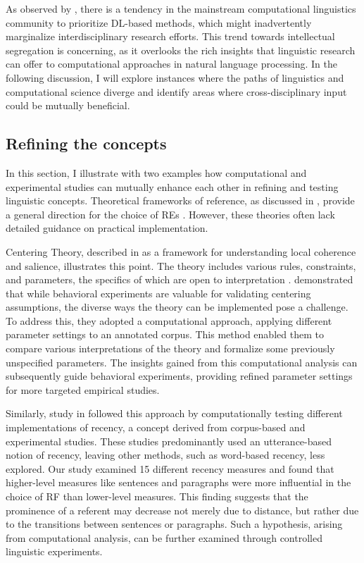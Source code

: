 \begin{sloppypar}
As observed by \citet{rogers-augenstein-2020-improve}, there is a tendency in the mainstream computational linguistics community to prioritize DL-based methods, which might inadvertently marginalize interdisciplinary research efforts. This trend towards intellectual segregation is concerning, as it overlooks the rich insights that linguistic research can offer to computational approaches in natural language processing. In the following discussion, I will explore instances where the paths of linguistics and computational science diverge and identify areas where cross-disciplinary input could be mutually beneficial. 
\end{sloppypar}

\subsection{Refining the concepts} 
In this section, I illustrate with two examples how computational and experimental studies can mutually enhance each other in refining and testing linguistic concepts. Theoretical frameworks of reference, as discussed in , provide a general direction for the choice of REs \citep{gundel1993cognitive, ariel2001accessibility, grosz1995centering}. However, these theories often lack detailed guidance on practical implementation.

Centering Theory, described in  as a framework for understanding local coherence and salience, illustrates this point. The theory includes various rules, constraints, and parameters, the specifics of which are open to interpretation \citep{poesio2004centering}. \citeauthor{poesio2004centering} demonstrated that while behavioral experiments are valuable for validating centering assumptions, the diverse ways the theory can be implemented pose a challenge. To address this, they adopted a computational approach, applying different parameter settings to an annotated corpus. This method enabled them to compare various interpretations of the theory and formalize some previously unspecified parameters. The insights gained from this computational analysis can subsequently guide behavioral experiments, providing refined parameter settings for more targeted empirical studies.

Similarly, study \studC in  followed this approach by computationally testing different implementations of recency, a concept derived from corpus-based \citep{Givon1983, ariel1990accessing} and experimental \citep{Arnold2010} studies. These studies predominantly used an utterance-based notion of recency, leaving other methods, such as word-based recency, less explored. Our study examined 15 different recency measures and found that higher-level measures like sentences and paragraphs were more influential in the choice of RF than lower-level measures. This finding suggests that the prominence of a referent may decrease not merely due to distance, but rather due to the transitions between sentences or paragraphs. Such a hypothesis, arising from computational analysis, can be further examined through controlled linguistic experiments.

